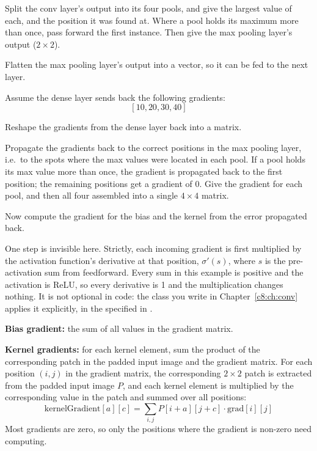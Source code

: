 Split the conv layer's output into its four pools, and give the largest value of each, and the
position it was found at. Where a pool holds its maximum more than once, pass forward the first
instance. Then give the max pooling layer's output ($2 \times 2$).

Flatten the max pooling layer's output into a vector, so it can be fed to the next layer.

\label{c6:ex:2}
Assume the dense layer sends back the following gradients:
\[
  [10, 20, 30, 40]
\]

Reshape the gradients from the dense layer back into a matrix.

Propagate the gradients back to the correct positions in the max pooling layer, i.e.\ to the spots
where the max values were located in each pool. If a pool holds its max value more than once, the
gradient is propagated back to the first position; the remaining positions get a gradient of 0.
Give the gradient for each pool, and then all four assembled into a single $4 \times 4$ matrix.

Now compute the gradient for the bias and the kernel from the error propagated back.

One step is invisible here. Strictly, each incoming gradient is first multiplied by the activation
function's derivative at that position, $\sigma'(s)$, where $s$ is the pre-activation sum from
feedforward. Every sum in this example is positive and the activation is ReLU, so every derivative
is 1 and the multiplication changes nothing. It is not optional in code: the  class you
write in Chapter~\ref{c8:ch:conv} applies it explicitly, in the  specified in
.

\textbf{Bias gradient:} the sum of all values in the gradient matrix.

\textbf{Kernel gradients:} for each kernel element, sum the product of the corresponding patch in
the padded input image and the gradient matrix. For each position $(i, j)$ in the gradient matrix,
the corresponding $2 \times 2$ patch is extracted from the padded input image $P$, and each kernel
element is multiplied by the corresponding value in the patch and summed over all positions:
\[
  \text{kernelGradient}[a][c] = \sum_{i,j} P[i+a][j+c] \cdot \text{grad}[i][j]
\]
Most gradients are zero, so only the positions where the gradient is non-zero need computing.


